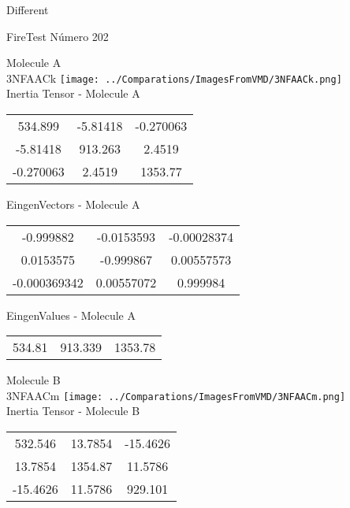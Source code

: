 \begin{center}
\vtab
\vtab
\textcolor{NavyBlue}{\Large Different}
\end{center}

 \newpage

\vtab[-2cm]
\begin{center}
{\large FireTest \tab Número 202}
\end{center}
\begin{multicols}{2}
\begin{center}

Molecule A \\ 
3NFAACk
\texttt{[image: ../Comparations/ImagesFromVMD/3NFAACk.png]}
\\
Inertia Tensor - Molecule A \\
\vtab

\begin{tabular}{|c c c|}
534.899	 & 	-5.81418	 & 	-0.270063	 \\
-5.81418	 & 	913.263	 & 	2.4519	 \\
-0.270063	 & 	2.4519	 & 	1353.77
\end{tabular}

\vtab
 EingenVectors - Molecule A     \\
\vtab
\begin{tabular}{|c c c|}
-0.999882	 & 	-0.0153593	 & 	-0.00028374	 \\
0.0153575	 & 	-0.999867	 & 	0.00557573	 \\
-0.000369342	 & 	0.00557072	 & 	0.999984
\end{tabular}

\vtab
 EingenValues - Molecule A     \\
\vtab
\begin{tabular}{|c c c|}
534.81	 & 	913.339	 & 	1353.78	 \\
\end{tabular}
\columnbreak

Molecule B \\ 
3NFAACm
\texttt{[image: ../Comparations/ImagesFromVMD/3NFAACm.png]}
\\
Inertia Tensor - Molecule B \\
\vtab

\begin{tabular}{|c c c|}
532.546	 & 	13.7854	 & 	-15.4626	 \\
13.7854	 & 	1354.87	 & 	11.5786	 \\
-15.4626	 & 	11.5786	 & 	929.101
\end{tabular}


\end{center}
\end{multicols}
